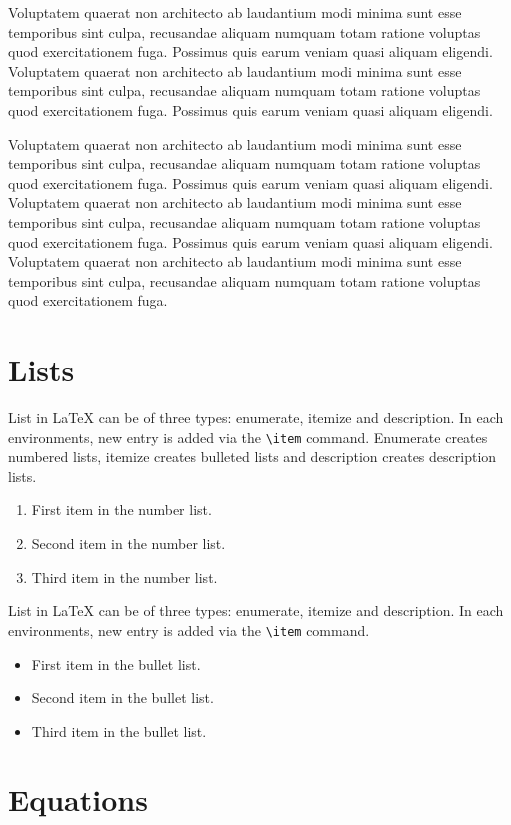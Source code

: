\documentclass[autowc]{CUP-JNL-PPS}
\begin{document}
Voluptatem quaerat non architecto ab laudantium
modi minima sunt esse temporibus sint culpa, recusandae aliquam numquam
totam ratione voluptas quod exercitationem fuga. Possimus quis earum veniam
quasi aliquam eligendi.
Voluptatem quaerat non architecto ab laudantium
modi minima sunt esse temporibus sint culpa, recusandae aliquam numquam
totam ratione voluptas quod exercitationem fuga. Possimus quis earum veniam
quasi aliquam eligendi.

Voluptatem quaerat non architecto ab laudantium
modi minima sunt esse temporibus sint culpa, recusandae aliquam numquam
totam ratione voluptas quod exercitationem fuga. Possimus quis earum veniam
quasi aliquam eligendi.
Voluptatem quaerat non architecto ab laudantium
modi minima sunt esse temporibus sint culpa, recusandae aliquam numquam
totam ratione voluptas quod exercitationem fuga. Possimus quis earum veniam
quasi aliquam eligendi.
Voluptatem quaerat non architecto ab laudantium
modi minima sunt esse temporibus sint culpa, recusandae aliquam numquam
totam ratione voluptas quod exercitationem fuga.


\section{Lists}

List in \LaTeX{} can be of three types: enumerate, itemize and description.
In each environments, new entry is added via the \verb+\item+ command.
Enumerate creates numbered lists, itemize creates bulleted lists and
description creates description lists.
\begin{enumerate}[1.]
\item First item in the number list.
\item Second item in the number list.
\item Third item in the number list.
\end{enumerate}
List in \LaTeX{} can be of three types: enumerate, itemize and description.
In each environments, new entry is added via the \verb+\item+ command.
\begin{itemize}
\item First item in the bullet list.
\item Second item in the bullet list.
\item Third item in the bullet list.
\end{itemize}


\section{Equations}
\end{document}
